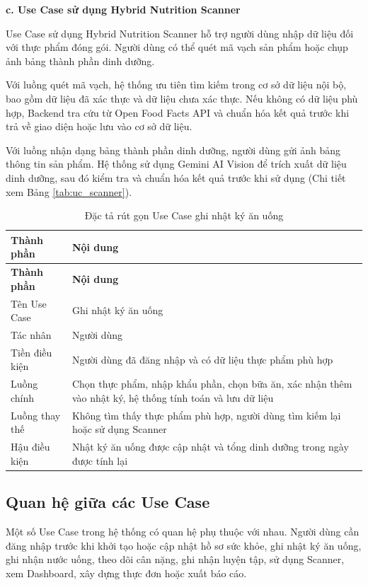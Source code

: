 \documentclass[12pt, a4paper]{report}
\begin{document}
\textbf{c. Use Case sử dụng Hybrid Nutrition Scanner}

Use Case sử dụng Hybrid Nutrition Scanner hỗ trợ người dùng nhập dữ liệu đối với thực phẩm đóng gói. Người dùng có thể quét mã vạch sản phẩm hoặc chụp ảnh bảng thành phần dinh dưỡng.

Với luồng quét mã vạch, hệ thống ưu tiên tìm kiếm trong cơ sở dữ liệu nội bộ, bao gồm dữ liệu đã xác thực và dữ liệu chưa xác thực. Nếu không có dữ liệu phù hợp, Backend tra cứu từ Open Food Facts API và chuẩn hóa kết quả trước khi trả về giao diện hoặc lưu vào cơ sở dữ liệu.

Với luồng nhận dạng bảng thành phần dinh dưỡng, người dùng gửi ảnh bảng thông tin sản phẩm. Hệ thống sử dụng Gemini AI Vision để trích xuất dữ liệu dinh dưỡng, sau đó kiểm tra và chuẩn hóa kết quả trước khi sử dụng (Chi tiết xem Bảng \ref{tab:uc_scanner}).

\begin{longtable}{|>{\raggedright\arraybackslash}p{5cm}|p{10cm}|}
\caption{Đặc tả rút gọn Use Case ghi nhật ký ăn uống}
\label{tab:uc_ghi_nhat_ky} \\
\hline
\textbf{Thành phần} & \textbf{Nội dung} \\
\hline
\endfirsthead
\hline
\textbf{Thành phần} & \textbf{Nội dung} \\
\hline
\endhead

Tên Use Case & Ghi nhật ký ăn uống \\
\hline
Tác nhân & Người dùng \\
\hline
Tiền điều kiện & Người dùng đã đăng nhập và có dữ liệu thực phẩm phù hợp \\
\hline
Luồng chính & Chọn thực phẩm, nhập khẩu phần, chọn bữa ăn, xác nhận thêm vào nhật ký, hệ thống tính toán và lưu dữ liệu \\
\hline
Luồng thay thế & Không tìm thấy thực phẩm phù hợp, người dùng tìm kiếm lại hoặc sử dụng Scanner \\
\hline
Hậu điều kiện & Nhật ký ăn uống được cập nhật và tổng dinh dưỡng trong ngày được tính lại \\
\hline
\end{longtable}

\subsection{Quan hệ giữa các Use Case}Một số Use Case trong hệ thống có quan hệ phụ thuộc với nhau. Người dùng cần đăng nhập trước khi khởi tạo hoặc cập nhật hồ sơ sức khỏe, ghi nhật ký ăn uống, ghi nhận nước uống, theo dõi cân nặng, ghi nhận luyện tập, sử dụng Scanner, xem Dashboard, xây dựng thực đơn hoặc xuất báo cáo.
\end{document}
